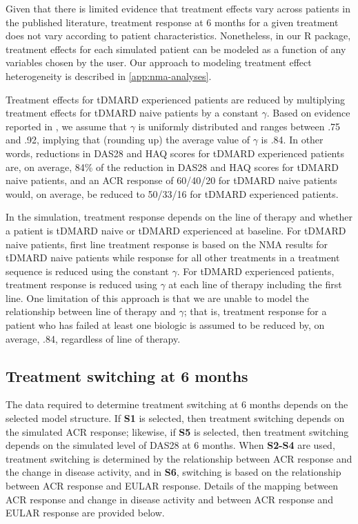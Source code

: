 \documentclass[11pt,final,fleqn]{article}
\theoremstyle{plain}
\newcommand\R{{\textsf{R}}}
\begin{document}
Given that there is limited evidence that treatment effects vary across patients in the published literature, treatment response at 6 months for a given treatment does not vary according to patient characteristics. Nonetheless, in our \R{} package, treatment effects for each simulated patient can be modeled as a function of any variables chosen by the user. Our approach to modeling treatment effect heterogeneity is described in \autoref{app:nma-analyses}. 

Treatment effects for tDMARD experienced patients are reduced by multiplying treatment effects for tDMARD naive patients by a constant $\gamma$. Based on evidence reported in \citet{carlson2015economic}, we assume that $\gamma$ is uniformly distributed and ranges between .75 and .92, implying that (rounding up) the average value of $\gamma$ is .84. In other words, reductions in DAS28 and HAQ scores for tDMARD experienced patients are, on average, 84\% of the reduction in DAS28 and HAQ scores for tDMARD naive patients, and an ACR response of 60/40/20 for tDMARD naive patients would, on average, be reduced to 50/33/16 for tDMARD experienced patients. 

In the simulation, treatment response depends on the line of therapy and whether a patient is tDMARD naive or tDMARD experienced at baseline. For tDMARD naive patients, first line treatment response is based on the NMA results for tDMARD naive patients while response for all other treatments in a treatment sequence is reduced using the constant $\gamma$. For tDMARD experienced patients, treatment response is reduced using $\gamma$ at each line of therapy including the first line. One limitation of this approach is that we are unable to model the relationship between line of therapy and $\gamma$; that is, treatment response for a patient who has failed at least one biologic is assumed to be reduced by, on average, .84, regardless of line of therapy. 

\subsection{Treatment switching at 6 months}
The data required to determine treatment switching at 6 months depends on the selected model structure. If \textbf{S1} is selected, then treatment switching depends on the simulated ACR response; likewise, if \textbf{S5} is selected, then treatment switching depends on the simulated level of DAS28 at 6 months. When \textbf{S2-S4} are used, treatment switching is determined by the relationship between ACR response and the change in disease activity, and in \textbf{S6}, switching is based on the relationship between ACR response and EULAR response. Details of the mapping between ACR response and change in disease activity and between ACR response and EULAR response are provided below.  
\end{document}
